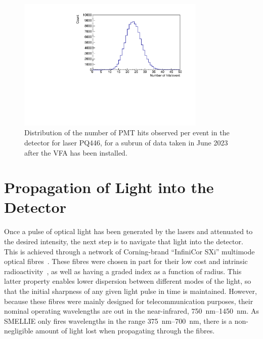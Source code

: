 \begin{figure}
    \centering
    \includegraphics[width=0.8\textwidth]{3_SMELLIEHardware/images/nhit_dist_310296_8.pdf}
    \caption[Distribution of the number of PMT hits observed per event for laser PQ446, after the VFA was added]
    {Distribution of the number of PMT hits observed per event in the detector for laser PQ446, for a subrun of data taken in June 2023 after the VFA has been installed.}
    \label{fig:pq_nhit_dist_post_vfa}
\end{figure}

\section{Propagation of Light into the Detector}\label{sec:smellie_fibres}
Once a pulse of optical light has been generated by the lasers and attenuated to the desired intensity, the next step is to navigate that light into the detector. This is achieved through a network of Corning-brand ``InfiniCor SXi'' multimode optical fibres~\cite{corningCorningInfinicor502007}. %
These fibres were chosen in part for their low cost and intrinsic radioactivity~\cite{clarkELLIEFibreRadioactivity2011}, %
as well as having a graded index as a function of radius. This latter property enables lower dispersion between different modes of the light, so that the initial sharpness of any given light pulse in time is maintained. However, because these fibres were mainly designed for telecommunication purposes, their nominal operating wavelengths are out in the near-infrared, \SIrange{750}{1450}{\nm}. As SMELLIE only fires wavelengths in the range \SIrange{375}{700}{\nm}, there is a non-negligible amount of light lost when propagating through the fibres.

